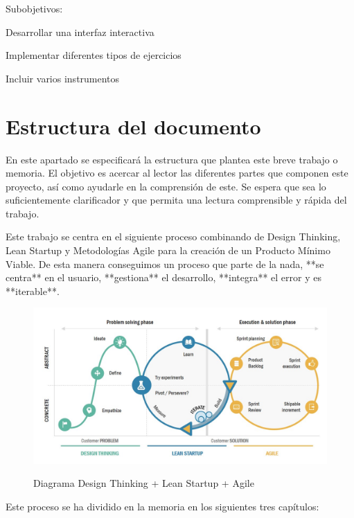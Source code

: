 \documentclass[12pt,twoside,titlepage]{report}
\begin{document}
Subobjetivos:
\begin{compactitem}
    \item Desarrollar una interfaz interactiva
    \item Implementar diferentes tipos de ejercicios 
    \item Incluir varios instrumentos
\end{compactitem}

\section{Estructura del documento}

En este apartado se especificará la estructura que plantea este breve trabajo o memoria. El objetivo es acercar al lector las diferentes partes que componen este proyecto, así como ayudarle en la comprensión de este. Se espera que sea lo suficientemente clarificador y que permita una lectura comprensible y rápida del trabajo.

Este trabajo se centra en el siguiente proceso combinando de Design Thinking, Lean Startup y Metodologías Agile para la creación de un Producto Mínimo Viable. De esta manera conseguimos un proceso que parte de la nada, **se centra** en el usuario, **gestiona** el desarrollo, **integra** el error y es **iterable**.

\begin{figure}[H] 
    \includegraphics[scale=0.45]{LeanDesignAgile}
    \centering
    \label{fig:Lean Design Agile}
    \caption{Diagrama Design Thinking + Lean Startup + Agile}
\end{figure}

Este proceso se ha dividido en la memoria en los siguientes tres capítulos:
\end{document}
